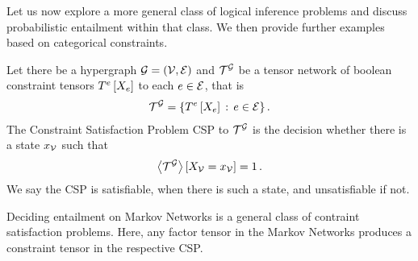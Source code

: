 
Let us now explore a more general class of logical inference problems and discuss probabilistic entailment within that class.
We then provide further examples based on categorical constraints.

\begin{definition}
	Let there be a hypergraph $\mathcal{G}=(\mathcal{V},\mathcal{E})$ and $\mathcal{T}^{\mathcal{G}}$ be a tensor network of boolean constraint tensors $T^{e}\left[X_{e}\right]$ to each $e\in\mathcal{E}$, that is
	\begin{align*}
		\mathcal{T}^{\mathcal{G}} = \{ T^{e}\left[X_{e}\right] \, : \, e\in\mathcal{E} \} \, .
	\end{align*}
	The Constraint Satisfaction Problem CSP to $\mathcal{T}^{\mathcal{G}}$ is the decision whether there is a state $x_{\mathcal{V}}$ such that
	\begin{align*}
		\left\langle \mathcal{T}^{\mathcal{G}}\right\rangle \left[ X_{\mathcal{V}}=x_{\mathcal{V}} \right] = 1 \, .
	\end{align*}
	We say the CSP is satisfiable, when there is such a state, and unsatisfiable if not.
\end{definition}


Deciding entailment on Markov Networks is a general class of contraint satisfaction problems.
Here, any factor tensor in the Markov Networks produces a constraint tensor in the respective CSP.

